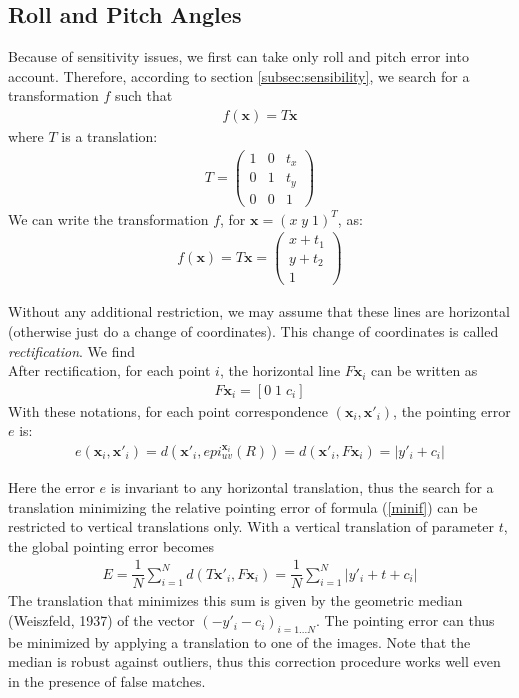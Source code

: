 \documentclass[paper=a4, fontsize=11pt, onecolumn, tikz, dvipsnames, svgnames, x11names]{article}
\begin{document}
\subsection{Roll and Pitch Angles}
Because of sensitivity issues, we first can take only roll and pitch error into account. Therefore, according to section \ref{subsec:sensibility}, we search for a transformation $f$ such that
\begin{align*}
f(\textbf{x}) = T\textbf{x}
\end{align*}
where $T$ is a translation:
\begin{align*}
T =
\begin{pmatrix}
1 & 0 & t_x \\
0 & 1 & t_y \\
0 & 0 & 1
\end{pmatrix}
\end{align*}
We can write the transformation $f$, for $ \textbf{x} = (  x \; y \; 1)^T $, as:
\begin{align*}
f(\textbf{x}) = T\textbf{x} =
\begin{pmatrix}
x + t_1 \\
y + t_2 \\
1
\end{pmatrix}
\end{align*}


Without any additional restriction, we may assume that these lines are horizontal (otherwise just do a change of coordinates). This change of coordinates is called \textit{rectification}. We find \\%

After rectification, for each point $i$, the horizontal line $F\textbf{x}_i$ can be written as
\begin{align*}
F\textbf{x}_i = \left[ 0 \; 1 \; c_i \right]
\end{align*}
With these notations, for each point correspondence $(\textbf{x}_i , \textbf{x}'_i)$, the pointing error $e$ is:
\begin{align*}
e(\textbf{x}_i, \textbf{x}'_i) = d(\textbf{x}'_i, epi^{\textbf{x}_i}_{u v}(R)) = d(\textbf{x}'_i, F\textbf{x}_i) = | y'_i + c_i|
\end{align*}

Here the error $e$ is invariant to any horizontal translation, thus the search for a translation minimizing the relative pointing error of formula (\ref{minif}) can be restricted to vertical translations only. With a vertical translation of parameter $t$, the global pointing error becomes
\begin{align*}
E = \dfrac{1}{N} \sum\limits_{i=1}^{N} d(T\textbf{x}'_i, F\textbf{x}_i) = \dfrac{1}{N} \sum\limits_{i=1}^{N} | y'_i + t+ c_i|
\end{align*}
The translation that minimizes this sum is given by the geometric median (Weiszfeld, 1937) of the vector $(-y'_i - c_i )_{i=1...N}$.  The pointing error can thus be minimized by applying a translation to one of the images. Note that the median is robust against outliers, thus this correction procedure works well even in the presence of false matches.
\end{document}
